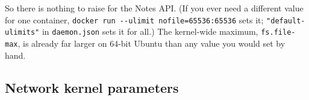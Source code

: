 \begin{codebox}[short]

\begin{Shaded}
\begin{Highlighting}[]
 

 
\end{Highlighting}
\end{Shaded}

\end{codebox}

\noindent{}So there is nothing to raise for the Notes API. (If you ever need a different value for one container, \texttt{docker\ run\ -}\allowbreak{}\texttt{-}\allowbreak{}\texttt{ulimit\ nofile=}\allowbreak{}\texttt{65536:}\allowbreak{}\texttt{65536} sets it; \texttt{"default-ulimits"} in \texttt{daemon.json} sets it for all.) The kernel-wide maximum, \texttt{fs.file-max}, is already far larger on 64-bit Ubuntu than any value you would set by hand.

\subsection*{Network kernel parameters}\label{21-system-setup:network-kernel-parameters}

